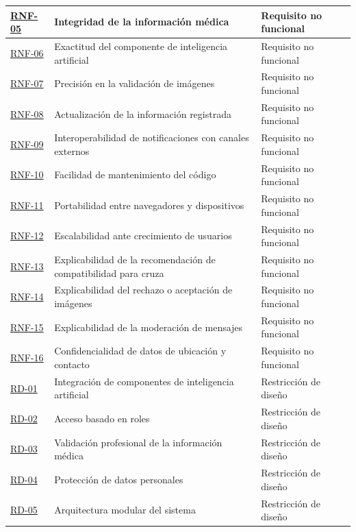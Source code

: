 \documentclass[journal,onecolumn]{IEEEtran}
\begin{document}
\begin{longtable}{@{}p{2.2cm} p{7.5cm} p{3.5cm}@{}}
		\hline
		\hyperref[tab:RNF-05]{RNF-05} & Integridad de la información médica & Requisito no funcional \\
		\hline
		\hyperref[tab:RNF-06]{RNF-06} & Exactitud del componente de inteligencia artificial & Requisito no funcional \\
		\hline
		\hyperref[tab:RNF-07]{RNF-07} & Precisión en la validación de imágenes & Requisito no funcional \\
		\hline
		\hyperref[tab:RNF-08]{RNF-08} & Actualización de la información registrada & Requisito no funcional \\
		\hline
		\hyperref[tab:RNF-09]{RNF-09} & Interoperabilidad de notificaciones con canales externos & Requisito no funcional \\
		\hline
		\hyperref[tab:RNF-10]{RNF-10} & Facilidad de mantenimiento del código & Requisito no funcional \\
		\hline
		\hyperref[tab:RNF-11]{RNF-11} & Portabilidad entre navegadores y dispositivos & Requisito no funcional \\
		\hline
		\hyperref[tab:RNF-12]{RNF-12} & Escalabilidad ante crecimiento de usuarios & Requisito no funcional \\
		\hline
		\hyperref[tab:RNF-13]{RNF-13} & Explicabilidad de la recomendación de compatibilidad para cruza & Requisito no funcional \\
		\hline
		\hyperref[tab:RNF-14]{RNF-14} & Explicabilidad del rechazo o aceptación de imágenes & Requisito no funcional \\
		\hline
		\hyperref[tab:RNF-15]{RNF-15} & Explicabilidad de la moderación de mensajes & Requisito no funcional \\
		\hline
		\hyperref[tab:RNF-16]{RNF-16} & Confidencialidad de datos de ubicación y contacto & Requisito no funcional \\
		\hline
		\hyperref[tab:RD-01]{RD-01} & Integración de componentes de inteligencia artificial & Restricción de diseño \\
		\hline
		\hyperref[tab:RD-02]{RD-02} & Acceso basado en roles & Restricción de diseño \\
		\hline
		\hyperref[tab:RD-03]{RD-03} & Validación profesional de la información médica & Restricción de diseño \\
		\hline
		\hyperref[tab:RD-04]{RD-04} & Protección de datos personales & Restricción de diseño \\
		\hline
		\hyperref[tab:RD-05]{RD-05} & Arquitectura modular del sistema & Restricción de diseño \\

\end{longtable}
\end{document}
